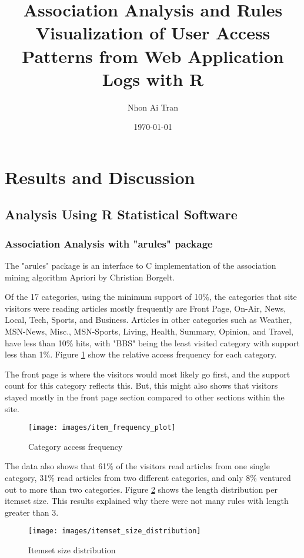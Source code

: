 \documentclass{article}
\title{Association Analysis and Rules Visualization of User Access Patterns from Web Application Logs with R}
\author{Nhon Ai Tran}
\date{\today}
\begin{document}
\maketitle

\section{Results and Discussion}
\subsection{Analysis Using R Statistical Software}
\subsubsection{Association Analysis with "arules" package}
The "arules" package is an interface to C implementation of the association mining algorithm Apriori by Christian Borgelt.  

Of the 17 categories, using the minimum support of 10\%, the categories that site visitors were reading articles mostly frequently are Front Page, On-Air, News, Local, Tech, Sports, and Business.  Articles in other categories such as Weather, MSN-News, Misc., MSN-Sports, Living, Health, Summary, Opinion, and Travel, have less than 10\% hits, with "BBS" being the least visited category with support less than 1\%.  Figure \ref{fig:item_frequency} show the relative access frequency for each category. 

The front page is where the visitors would most likely go first, and the support count for this category reflects this.  But, this might also shows that visitors stayed mostly in the front page section compared to other sections within the site.  

\begin{figure}[h!]
  \centering
    \texttt{[image: images/item\_frequency\_plot]}
    \caption{Category access frequency}
    \label{fig:item_frequency}
\end{figure}

The data also shows that 61\% of the visitors read articles from one single category, 31\% read articles from two different categories, and only 8\% ventured out to more than two categories.  Figure  \ref{fig:itemset_size_distribution} shows the length distribution per itemset size.  This results explained why there were not many rules with length greater than 3.

\begin{figure}[h!]
  \centering
    \texttt{[image: images/itemset\_size\_distribution]}
    \caption{Itemset size distribution}
    \label{fig:itemset_size_distribution}
\end{figure}
\end{document}
